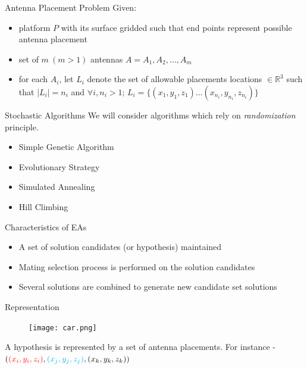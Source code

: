 \documentclass{beamer}
\begin{document}
    \begin{frame}[t]{Antenna Placement Problem}
        Given:
    \begin{itemize} \itemsep1.5em
            \item<1-> platform $P$ with its surface gridded such that end points represent possible antenna placement
            \item<2-> set of  $m~(m > 1)$ antennas $A = {A_1, A_2, \dots, A_m}$
            \item<3-> for each $A_i$, let $L_i$ denote the set of allowable placements locations $\in \mathbb R^3$ such that $\mid L_i \mid = n_i$ and $\forall i, n_i > 1$; $L_i = \{(x_{1}, y_{1}, z_{1}) \dots (x_{n_i}, y_{n_i}, z_{n_i})\}$
        \end{itemize}
        \vspace{10px}
        \centering{}
    \end{frame}

    \begin{frame}[t]{Stochastic Algorithms}
        We will consider algorithms which rely on \textit{randomization} principle.
        \vspace{10px}
    \begin{itemize} \itemsep1.5em
            \item Simple Genetic Algorithm
            \item Evolutionary Strategy
            \item Simulated Annealing
            \item Hill Climbing
        \end{itemize}
    \end{frame}

    \begin{frame}[t]{Characteristics of EAs}
    \begin{itemize} \itemsep1.5em
            \item A set of solution candidates (or hypothesis) maintained
            \item Mating selection process is performed on the solution candidates
            \item Several solutions are combined to generate new candidate set solutions
        \end{itemize}
    \end{frame}



    \begin{frame}[t]{Representation}
        \begin{figure}
            \centering
            \texttt{[image: car.png]}
        \end{figure}
        A hypothesis is represented by a set of antenna placements. For instance - $(\textcolor{red}{(x_i, y_i, z_i)}, \textcolor{cyan}{(x_j, y_j, z_j)}, \textcolor{black}{(x_k, y_k, z_k)})$
    \end{frame}
\end{document}
